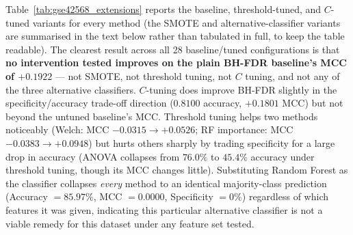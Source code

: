 \begin{table}[H]
    \centering
    \caption{Effect of pre-selection SMOTE on the retained probe count and MCC, filter methods on GSE42568 (5-fold CV mean).}
    \label{tab:gse42568_smote_inflation}

    \small
\end{table}

Table~\ref{tab:gse42568_extensions} reports the baseline, threshold-tuned, and $C$-tuned variants for every method (the SMOTE and alternative-classifier variants are summarised in the text below rather than tabulated in full, to keep the table readable). The clearest result across all 28 baseline/tuned configurations is that \textbf{no intervention tested improves on the plain BH-FDR baseline's MCC of $+0.1922$} --- not SMOTE, not threshold tuning, not $C$ tuning, and not any of the three alternative classifiers. $C$-tuning does improve BH-FDR slightly in the specificity/accuracy trade-off direction ($0.8100$ accuracy, $+0.1801$ MCC) but not beyond the untuned baseline's MCC. Threshold tuning helps two methods noticeably (Welch: MCC $-0.0315 \to +0.0526$; RF importance: MCC $-0.0383 \to +0.0948$) but hurts others sharply by trading specificity for a large drop in accuracy (ANOVA collapses from $76.0\%$ to $45.4\%$ accuracy under threshold tuning, though its MCC changes little). Substituting Random Forest as the classifier collapses \emph{every} method to an identical majority-class prediction (Accuracy $=85.97\%$, MCC $=0.0000$, Specificity $=0\%$) regardless of which features it was given, indicating this particular alternative classifier is not a viable remedy for this dataset under any feature set tested.

